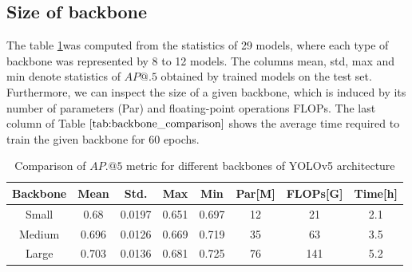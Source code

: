 \subsection{Size of backbone}
The table \ref{tab:backbone_comparison}was computed from the statistics of 29 models, where each type of backbone was represented by 8 to 12 models. The columns mean, std, max and min denote statistics of $AP@.5$ obtained by trained models on the test set. Furthermore, we can inspect the size of a given backbone, which is induced by its number of parameters (Par) and floating-point operations FLOPs. The last column of Table $\ref{tab:backbone_comparison}$ shows the average time required to train the given backbone for $60$ epochs.
\begin{table}[H]
    \begin{tabular}{|c|c|c|c|c|c|c|c|}
        \hline
        Backbone & Mean  & Std.   & Max   & Min   & Par[M] & FLOPs[G] & Time[h] \\ \hline
        Small    & 0.68  & 0.0197 & 0.651 & 0.697 & 12     & 21       & 2.1     \\ \hline
        Medium   & 0.696 & 0.0126 & 0.669 & 0.719 & 35     & 63       & 3.5     \\ \hline
        Large    & 0.703 & 0.0136 & 0.681 & 0.725 & 76     & 141      & 5.2     \\ \hline
    \end{tabular}
    \caption{Comparison of $AP.@5$ metric for different backbones of YOLOv5 architecture}
    \label{tab:backbone_comparison}
\end{table}

